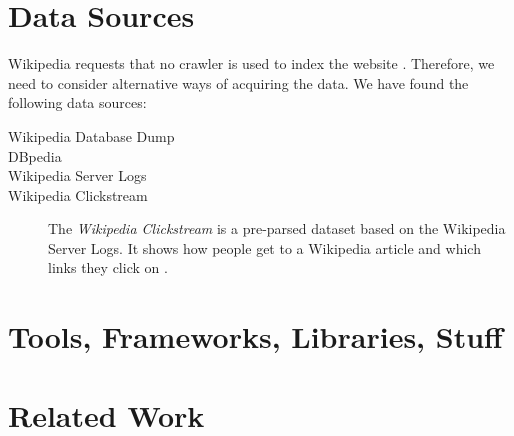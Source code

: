 \section{Data Sources}
Wikipedia requests that no crawler is used to index the website . Therefore, we need to consider alternative ways of acquiring the data. We have found the following data sources:
\begin{description}
  \item[Wikipedia Database Dump]
  \item[DBpedia]
  \item[Wikipedia Server Logs] 
  \item[Wikipedia Clickstream] The \emph{Wikipedia Clickstream} is a pre-parsed dataset based on the Wikipedia Server Logs. It shows how people get to a Wikipedia article and which links they click on \cite{wiki-clickstream}.
\end{description}

\section{Tools, Frameworks, Libraries, Stuff}\label{sec:selecting_tools}



\section{Related Work}\label{sec:related_work}
\dummy